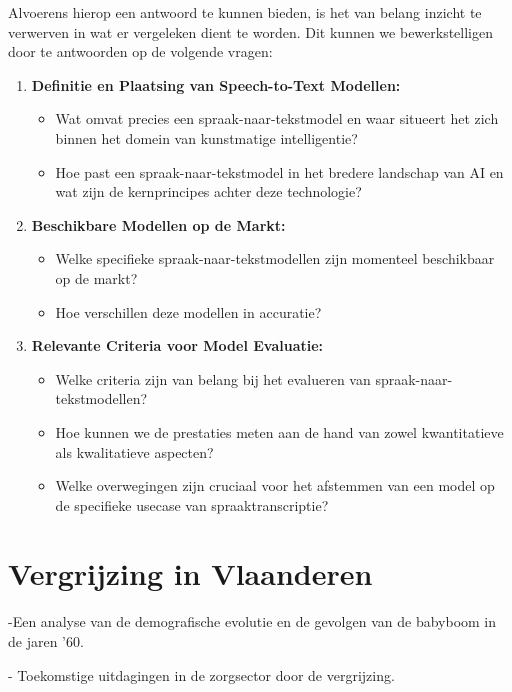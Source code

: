 Alvoerens hierop een antwoord te kunnen bieden, is het van belang inzicht te verwerven in wat er vergeleken dient te worden. Dit kunnen we bewerkstelligen door te antwoorden op de volgende vragen:
\begin{enumerate}[label=\arabic*.]
    \item \textbf{Definitie en Plaatsing van Speech-to-Text Modellen:}
    \begin{itemize}
        \item Wat omvat precies een spraak-naar-tekstmodel en waar situeert het zich binnen het domein van kunstmatige intelligentie?
        \item Hoe past een spraak-naar-tekstmodel in het bredere landschap van AI en wat zijn de kernprincipes achter deze technologie?
    \end{itemize}
    
    \item \textbf{Beschikbare Modellen op de Markt:}
    \begin{itemize}
        \item Welke specifieke spraak-naar-tekstmodellen zijn momenteel beschikbaar op de markt?
        \item Hoe verschillen deze modellen in accuratie?
    \end{itemize}
    
    \item \textbf{Relevante Criteria voor Model Evaluatie:}
    \begin{itemize}
        \item Welke criteria zijn van belang bij het evalueren van spraak-naar-tekstmodellen?
        \item Hoe kunnen we de prestaties meten aan de hand van zowel kwantitatieve als kwalitatieve aspecten?
        \item Welke overwegingen zijn cruciaal voor het afstemmen van een model op de specifieke usecase van spraaktranscriptie?
    \end{itemize}
\end{enumerate}

\section{Vergrijzing in Vlaanderen}
-Een analyse van de demografische evolutie en de gevolgen van de babyboom in de jaren '60. 

- Toekomstige uitdagingen in de zorgsector door de vergrijzing. 

